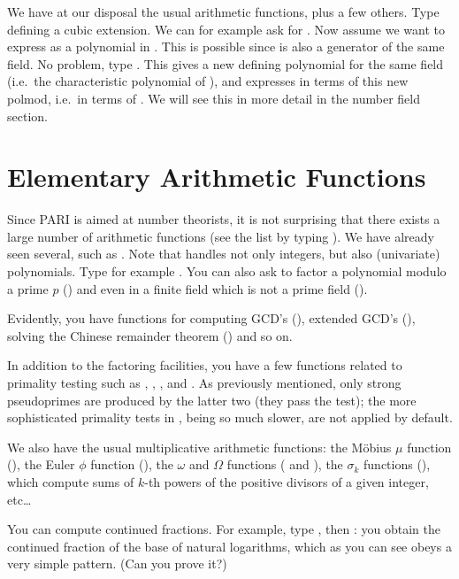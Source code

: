 We have at our disposal the usual arithmetic functions, plus a few others.
Type  defining a cubic extension. We can for
example ask for . Now assume we want to express 
as a polynomial in . This is possible since  is also a
generator of the same field. No problem, type . This gives
a new defining polynomial for the same field (i.e.~the characteristic
polynomial of ), and expresses  in terms of this new polmod,
i.e.~in terms of . We will see this in more detail in the number
field section.

\section{Elementary Arithmetic Functions}

Since PARI is aimed at number theorists, it is not surprising that there
exists a large number of arithmetic functions (see the list by typing
). We have already seen several, such as . Note that
 handles not only integers, but also (univariate) polynomials.
Type for example . You can also ask to factor a
polynomial modulo a prime $p$ () and even in a finite field
which is not a prime field ().

Evidently, you have functions for computing GCD's (), extended GCD's
(), solving the Chinese remainder theorem () and so
on.

In addition to the factoring facilities, you have a few functions related to
primality testing such as , ,
, and . As previously mentioned, only strong
pseudoprimes are produced by the latter two (they pass the
 test); the more sophisticated primality tests in
, being so much slower, are not applied by default.

We also have the usual multiplicative arithmetic functions: the M\"obius $\mu$
function (), the Euler $\phi$ function (), the
$\omega$ and $\Omega$ functions ( and ), the
$\sigma_k$ functions (), which compute sums of $k$-th powers of the
positive divisors of a given integer, etc\dots

You can compute continued fractions. For example, type , then
: you obtain the continued fraction of the base of
natural logarithms, which as you can see obeys a very simple pattern. (Can
you prove it?)

